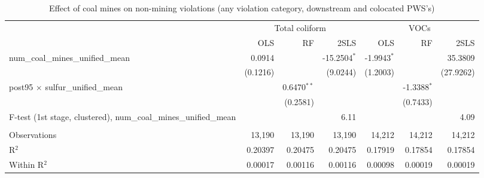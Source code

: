 
\begin{table}[htbp]
   
   \caption{\label{2sls_dwnstrmcolocate_nonminevio_allcat} Effect of coal mines on non-mining violations (any violation category, downstream and colocated PWS's)}
   \bigskip
   
   \centering
   
   \begin{adjustbox}{width = \textwidth, center}
      
      
      \begin{tabular}{lrrrrrr}
         \toprule
         
          & \multicolumn{3}{c}{Total coliform} & \multicolumn{3}{c}{VOCs}\\
         
                                                                            & OLS      & RF            & 2SLS           & OLS           & RF            & 2SLS\\  
         
         \midrule 
         num\_coal\_mines\_unified\_mean                                    & 0.0914   &               & -15.2504$^{*}$ & -1.9943$^{*}$ &               & 35.3809\\   
                                                                            & (0.1216) &               & (9.0244)       & (1.2003)      &               & (27.9262)\\   
         post95 $\times$ sulfur\_unified\_mean                              &          & 0.6470$^{**}$ &                &               & -1.3388$^{*}$ &   \\   
                                                                            &          & (0.2581)      &                &               & (0.7433)      &   \\   
         
         F-test (1st stage, clustered), num\_coal\_mines\_unified\_mean     &          &               & 6.11           &               &               & 4.09\\  
         
          \\
         
         Observations                                                       & 13,190   & 13,190        & 13,190         & 14,212        & 14,212        & 14,212\\  
         R$^2$                                                              & 0.20397  & 0.20475       & 0.20475        & 0.17919       & 0.17854       & 0.17854\\  
         Within R$^2$                                                       & 0.00017  & 0.00116       & 0.00116        & 0.00098       & 0.00019       & 0.00019\\  
         

\end{tabular}
\end{adjustbox}
\end{table}
